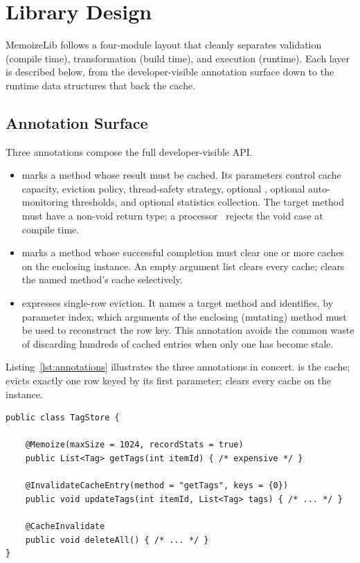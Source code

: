 \section{Library Design}\label{sec:design}

MemoizeLib follows a four-module layout that cleanly separates validation (compile time), transformation (build time), and execution (runtime). Each layer is described below, from the developer-visible annotation surface down to the runtime data structures that back the cache.

\subsection{Annotation Surface}\label{sec:annotations}

Three annotations compose the full developer-visible API.

\begin{itemize}[leftmargin=*,nosep]
    \item {} marks a method whose result must be cached. Its parameters control cache capacity, eviction policy, thread-safety strategy, optional \ttl, optional auto-monitoring thresholds, and optional statistics collection. The target method must have a non-void return type; a \ksp processor~\cite{ksp} rejects the void case at compile time.
    \item {} marks a method whose successful completion must clear one or more caches on the enclosing instance. An empty argument list clears every cache;  clears the named method's cache selectively.
    \item {} expresses single-row eviction. It names a target  method and identifies, by parameter index, which arguments of the enclosing (mutating) method must be used to reconstruct the row key. This annotation avoids the common waste of discarding hundreds of cached entries when only one has become stale.
\end{itemize}

Listing~\ref{lst:annotations} illustrates the three annotations in concert.  is the cache;  evicts exactly one row keyed by its first parameter;  clears every cache on the instance.

\begin{lstlisting}[caption={Annotations in concert.},label={lst:annotations}]
public class TagStore {

    @Memoize(maxSize = 1024, recordStats = true)
    public List<Tag> getTags(int itemId) { /* expensive */ }

    @InvalidateCacheEntry(method = "getTags", keys = {0})
    public void updateTags(int itemId, List<Tag> tags) { /* ... */ }

    @CacheInvalidate
    public void deleteAll() { /* ... */ }
}
\end{lstlisting}

